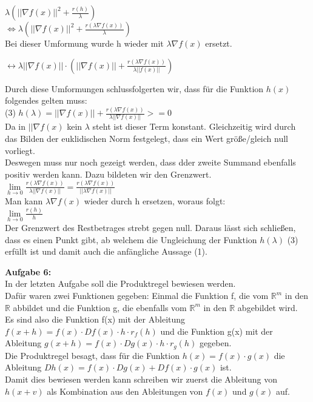 $\lambda (||\nabla f(x)||^2 + \frac{r(h)}{\lambda})$ \\

$\Leftrightarrow \lambda(||\nabla f(x)||^2 + \frac{r(\lambda \nabla f(x))}{\lambda})$ \\

Bei dieser Umformung wurde h wieder mit $\lambda\nabla f(x)$ ersetzt.

$\leftrightarrow \lambda ||\nabla f(x)|| \cdot (||\nabla f(x)|| + \frac{r(\lambda \nabla f(x))}{\lambda || f(x)||})$


Durch diese Umformungen schlussfolgerten wir, dass f\"ur die Funktion $h(x)$ folgendes gelten muss:\\
(3) $h(\lambda)=||\nabla f(x)|| + \frac{r(\lambda\nabla f(x))}{\lambda||\nabla f(x)||} >=0$ \\

Da in $||\nabla f(x)$ kein $\lambda$ steht ist dieser Term konstant. Gleichzeitig wird durch das Bilden der euklidischen Norm festgelegt, dass ein Wert größe/gleich null vorliegt. \\ %
Deswegen muss nur noch gezeigt werden, dass dder zweite Summand ebenfalls positiv werden kann. Dazu bildeten wir den Grenzwert. \\ %
$\lim\limits_{h \rightarrow 0}{\frac{r(\lambda \nabla f(x))}{\lambda ||\nabla f(x)||}} = \frac{r(\lambda \nabla f(x))}{||\lambda  \nabla f(x)||}$ \\ %

Man kann $\lambda \nabla f(x)$ wieder durch h ersetzen, woraus folgt: \\
$\lim\limits_{h \rightarrow 0} \frac{r(h)}{h}$ \\

Der Grenzwert des Restbetrages strebt gegen null. Daraus lässt sich schließen, dass es einen Punkt gibt, ab welchem die Ungleichung der Funktion $h(\lambda)$ (3) erfüllt ist und damit auch die anfängliche Aussage (1). \\ %
\vspace{15pt}

\textbf{Aufgabe 6:} \\

In der letzten Aufgabe soll die Produktregel bewiesen werden. \\
Dafür waren zwei Funktionen gegeben: Einmal die Funktion f, die vom $\mathds{R}^m$ in den $\mathds{R}$ abbildet und die Funktion g, die ebenfalls vom $\mathds{R}^m$ in den $\mathds{R}$ abgebildet wird. \\
Es sind also die Funktion f(x) mit der Ableitung $f(x+h) = f(x) \cdot Df(x) \cdot h \cdot r_{f}(h)$ und die Funktion g(x) mit der Ableitung $g(x+h) = f(x) \cdot Dg(x) \cdot h \cdot r_{g}(h)$ gegeben. \\
Die Produktregel besagt, dass für die Funktion $h(x) = f(x) \cdot g(x)$ die Ableitung $Dh(x) = f(x) \cdot Dg(x) + Df(x) \cdot g(x)$ %
 ist. \\
Damit dies bewiesen werden kann schreiben wir zuerst die Ableitung von $h(x+v)$ als Kombination aus den Ableitungen von $f(x)$ und $g(x)$ auf.

